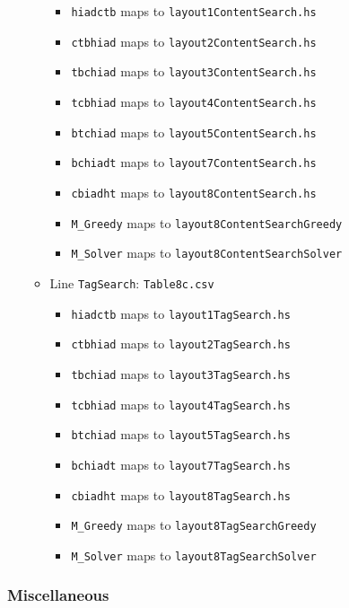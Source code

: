 \begin{itemize}
\begin{itemize}
    \begin{itemize}
    \tightlist
    \item
      \texttt{hiadctb} maps to \texttt{layout1ContentSearch.hs}
    \item
      \texttt{ctbhiad} maps to \texttt{layout2ContentSearch.hs}
    \item
      \texttt{tbchiad} maps to \texttt{layout3ContentSearch.hs}
    \item
      \texttt{tcbhiad} maps to \texttt{layout4ContentSearch.hs}
    \item
      \texttt{btchiad} maps to \texttt{layout5ContentSearch.hs}
    \item
      \texttt{bchiadt} maps to \texttt{layout7ContentSearch.hs}
    \item
      \texttt{cbiadht} maps to \texttt{layout8ContentSearch.hs}
    \item
      \texttt{M\_Greedy} maps to \texttt{layout8ContentSearchGreedy}
    \item
      \texttt{M\_Solver} maps to \texttt{layout8ContentSearchSolver}
    \end{itemize}
  \item
    Line \texttt{TagSearch}: \texttt{Table8c.csv}

    \begin{itemize}
    \tightlist
    \item
      \texttt{hiadctb} maps to \texttt{layout1TagSearch.hs}
    \item
      \texttt{ctbhiad} maps to \texttt{layout2TagSearch.hs}
    \item
      \texttt{tbchiad} maps to \texttt{layout3TagSearch.hs}
    \item
      \texttt{tcbhiad} maps to \texttt{layout4TagSearch.hs}
    \item
      \texttt{btchiad} maps to \texttt{layout5TagSearch.hs}
    \item
      \texttt{bchiadt} maps to \texttt{layout7TagSearch.hs}
    \item
      \texttt{cbiadht} maps to \texttt{layout8TagSearch.hs}
    \item
      \texttt{M\_Greedy} maps to \texttt{layout8TagSearchGreedy}
    \item
      \texttt{M\_Solver} maps to \texttt{layout8TagSearchSolver}
    \end{itemize}
  \end{itemize}
\end{itemize}

\hypertarget{miscellaneous}{%
\subsubsection{Miscellaneous}\label{miscellaneous}}

